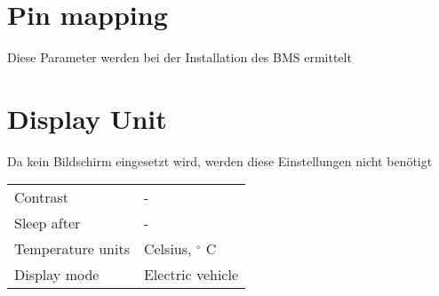 \section*{Pin mapping}
Diese Parameter werden bei der Installation des BMS ermittelt

\section*{Display Unit}
Da kein Bildschirm eingesetzt wird, werden diese Einstellungen nicht benötigt \\
\begin{tabular}{p{11cm}p{4cm}}
	Contrast & - \\
	Sleep after & - \\
	Temperature units & Celsius, $^\circ$ C \\
	Display mode & Electric vehicle
\end{tabular}